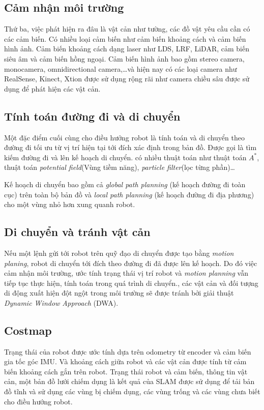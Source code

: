 {\subsection*{Cảm nhận môi trường}
Thứ ba, việc phát hiện ra đâu là vật cản như tường, các đồ vật yêu cầu cần có các cảm biến. Có nhiều loại cảm biến như cảm biến khoảng cách và cảm biến hình ảnh. Cảm biến khoảng cách dạng laser như LDS, LRF, LiDAR, cảm biến siêu âm và cảm biến hồng ngoại. Cảm biến hình ảnh bao gồm stereo camera, monocamera, omnidirectional camera,\dots và hiện nay có các loại camera như RealSense, Kinect, Xtion được sử dụng rộng rãi như camera chiều sâu được sử dụng để phát hiện các vật cản.

\subsection*{Tính toán đường đi và di chuyển}
Một đặc điểm cuối cùng cho điều hưởng robot là tính toán và di chuyển theo đường đi tối ưu từ vị trí hiện tại tới đích xác định trong bản đồ. Được gọi là tìm kiếm đường đi và lên kế hoạch di chuyển. có nhiều thuật toán như thuật toán ${A}^{*}$, thuật toán \textit{potential field}(Vùng tiềm năng), \textit{particle filter}(lọc từng phần)\dots

Kế hoạch di chuyển bao gồm cả \textit{global path planning} (kế hoạch đường đi toàn cục) trên toàn bộ bản đồ và \textit{local path planning} (kế hoạch đường đi địa phương) cho một vùng nhỏ hơn xung quanh robot.

\subsection*{Di chuyển và tránh vật cản}
Nếu một lệnh gửi tới robot trên quỹ đạo di chuyển được tạo bằng \textit{motion planing}, robot di chuyển tới đích theo đường đi đã được lên kế hoạch. Do đó việc cảm nhận môi trường, ước tính trạng thái vị trí robot và \textit{motion planning} vẫn tiếp tục thực hiện, tính toán trong quá trình di chuyển., các vật cản và đối tượng di động xuất hiện đột ngột trong môi trường sẽ được tránh bởi giải thuật \textit{Dynamic Window Approach} (DWA).

\subsection{Costmap}

Trạng thái của robot được ước tính dựa trên odometry từ encoder và cảm biến gia tốc góc IMU. Và khoảng cách giữa robot và các vật cản được tính từ cảm biến khoảng cách gắn trên robot. Trạng thái robot và cảm biến, thông tin vật cản, một bản đồ lưới chiếm dụng là kết quả của SLAM được sử dụng để tải bản đồ tĩnh và sử dụng các vùng bị chiếm dụng, các vùng trống và các vùng chưa biết cho điều hướng robot.

}
